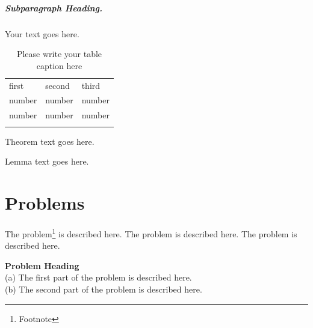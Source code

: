 \begin{multicols}{2}
\subparagraph{Subparagraph Heading.} Your text goes here.%
%
%
%
\begin{table}
\centering
\caption{Please write your table caption here}
\label{tab:1}       %
%
%
\begin{tabular}{lll}
\hline\noalign{\smallskip}
first & second & third  \\
\noalign{\smallskip}\hline\noalign{\smallskip}
number & number & number \\
number & number & number \\
\noalign{\smallskip}\hline
\end{tabular}
\end{table}
%
%
%
%
\begin{theorem}
Theorem text goes here.
\end{theorem}
%
%
\begin{lemma}
Lemma text goes here.
\end{lemma}
%
%
\section*{Problems}
%
\begin{prob}
\label{prob1}
The problem\footnote{Footnote} is described here. The
problem is described here. The problem is described here.
\end{prob}

\begin{prob}
\label{prob2}
\textbf{Problem Heading}\\
(a) The first part of the problem is described here.\\
(b) The second part of the problem is described here.
\end{prob}


\end{multicols}
